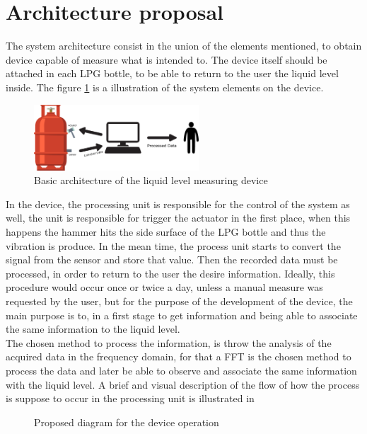 \section{Architecture proposal}
The system architecture consist in the union of the elements mentioned, to obtain device capable of measure what is intended to. The device itself should be attached in each LPG bottle, to be able to return to the user the liquid level inside. The figure \ref{fig:systemArch} is a illustration of the system elements on the device.\\
\begin{figure}[!htb]
    \centering
    \includegraphics[width=0.55\textwidth]{Chapters/3CHP/Images/bottleBaseAct.eps}
    \caption{Basic architecture of the liquid level measuring device}
    \label{fig:systemArch}
\end{figure}
In the device, the processing unit is responsible for the control of the system as well, the unit is responsible for trigger the actuator in the first place, when this happens the hammer hits the side surface of the LPG bottle and thus the vibration is produce. In the mean time, the process unit starts to convert the signal from the sensor and store that value. Then the recorded data must be processed, in order to return to the user the desire information. Ideally, this procedure would occur once or twice a day, unless a manual measure was requested by the user, but for the purpose of the development of the device, the main purpose is to, in a first stage to get information and being able to associate the same information to the liquid level.\\
The chosen method to process the information, is throw the analysis of the acquired data in the frequency domain, for that a FFT is the chosen method to process the data and later be able to observe and associate the same information with the liquid level. A brief and visual description of the flow of how the process is suppose to occur in the processing unit is illustrated in  
\begin{figure}[!htb]
    \centering
    \caption{Proposed diagram for the device operation}
    \label{fig:systemSWFlow}
\end{figure}\\

